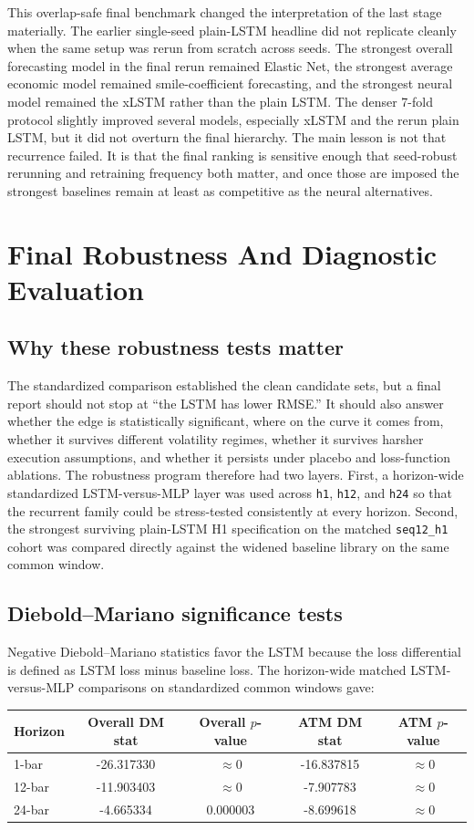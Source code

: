 \documentclass[12pt]{report}
\begin{document}
This overlap-safe final benchmark changed the interpretation of the last stage materially. The earlier single-seed plain-LSTM headline did not replicate cleanly when the same setup was rerun from scratch across seeds. The strongest overall forecasting model in the final rerun remained Elastic Net, the strongest average economic model remained smile-coefficient forecasting, and the strongest neural model remained the xLSTM rather than the plain LSTM. The denser 7-fold protocol slightly improved several models, especially xLSTM and the rerun plain LSTM, but it did not overturn the final hierarchy. The main lesson is not that recurrence failed. It is that the final ranking is sensitive enough that seed-robust rerunning and retraining frequency both matter, and once those are imposed the strongest baselines remain at least as competitive as the neural alternatives.

\chapter{Final Robustness And Diagnostic Evaluation}

\section{Why these robustness tests matter}
The standardized comparison established the clean candidate sets, but a final report should not stop at ``the LSTM has lower RMSE.'' It should also answer whether the edge is statistically significant, where on the curve it comes from, whether it survives different volatility regimes, whether it survives harsher execution assumptions, and whether it persists under placebo and loss-function ablations. The robustness program therefore had two layers. First, a horizon-wide standardized LSTM-versus-MLP layer was used across \texttt{h1}, \texttt{h12}, and \texttt{h24} so that the recurrent family could be stress-tested consistently at every horizon. Second, the strongest surviving plain-LSTM H1 specification on the matched \texttt{seq12\_h1} cohort was compared directly against the widened baseline library on the same common window.

\section{Diebold--Mariano significance tests}
Negative Diebold--Mariano statistics favor the LSTM because the loss differential is defined as LSTM loss minus baseline loss. The horizon-wide matched LSTM-versus-MLP comparisons on standardized common windows gave:
\begin{center}
\begin{tabular}{lcccc}
\toprule
Horizon & Overall DM stat & Overall $p$-value & ATM DM stat & ATM $p$-value \\
\midrule
1-bar & -26.317330 & $\approx 0$ & -16.837815 & $\approx 0$ \\
12-bar & -11.903403 & $\approx 0$ & -7.907783 & $\approx 0$ \\
24-bar & -4.665334 & 0.000003 & -8.699618 & $\approx 0$ \\
\bottomrule
\end{tabular}
\end{center}
\end{document}

